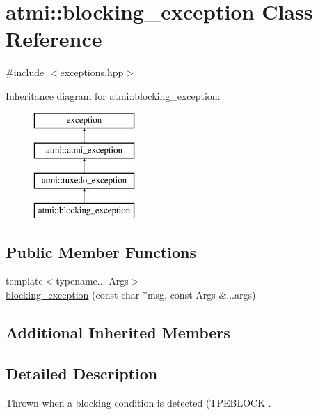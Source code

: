 \hypertarget{classatmi_1_1blocking__exception}{\section{atmi\+:\+:blocking\+\_\+exception Class Reference}
\label{classatmi_1_1blocking__exception}
}


{\ttfamily \#include $<$exceptions.\+hpp$>$}

Inheritance diagram for atmi\+:\+:blocking\+\_\+exception\+:\begin{figure}[H]
\begin{center}
\leavevmode
\includegraphics[height=4.000000cm]{classatmi_1_1blocking__exception}
\end{center}
\end{figure}
\subsection*{Public Member Functions}
\begin{DoxyCompactItemize}
\item 
{\footnotesize template$<$typename... Args$>$ }\\\hyperlink{classatmi_1_1blocking__exception_a2237c2b5b3264745e145d0e4e26838ad}{blocking\+\_\+exception} (const char $\ast$msg, const Args \&...args)
\end{DoxyCompactItemize}
\subsection*{Additional Inherited Members}


\subsection{Detailed Description}
Thrown when a blocking condition is detected (T\+P\+E\+B\+L\+O\+C\+K . 

